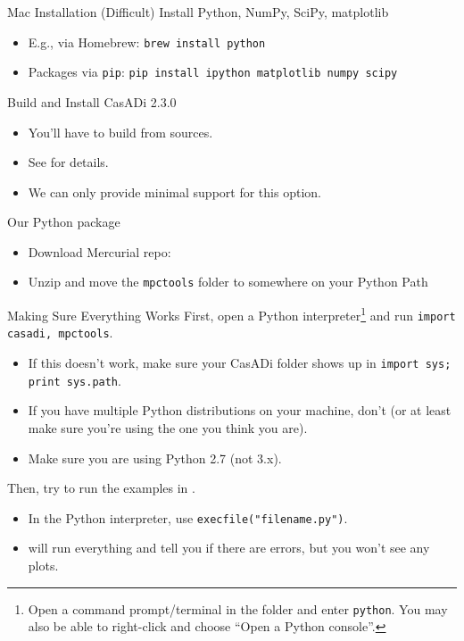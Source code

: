 \documentclass[xcolor=dvipsnames]{beamer}
\begin{document}
\begin{frame}{Mac Installation (Difficult)}
       Install Python, NumPy, SciPy, matplotlib
       \begin{itemize}
           \item E.g., via Homebrew: \lstinline[style=shell]!brew install python!
           \item Packages via \texttt{pip}: \lstinline[style=shell]!pip install ipython matplotlib numpy scipy
           !
        \end{itemize}
        
        \medskip
        
        Build and Install CasADi 2.3.0
        \begin{itemize}
            \item You'll have to build from sources.
            \item See  for details.
            \item We can only provide minimal support for this option.
        \end{itemize}
        
        \medskip
        
        Our Python package
        \begin{itemize}
            \item Download Mercurial repo: 
            \item Unzip and move the \texttt{mpctools} folder to somewhere on your Python Path
        \end{itemize}
\end{frame}

\begin{frame}{Making Sure Everything Works}
    First, open a Python interpreter\footnote{Open a command prompt/terminal in the  folder and enter \lstinline[style=shell]!python!. You may also be able to right-click and choose ``Open a Python console''.} and run \lstinline[style=python]!import casadi, mpctools!.
    \begin{itemize}
        \item If this doesn't work, make sure your CasADi folder shows up in \lstinline[style=python]!import sys; print sys.path!.
        \item If you have multiple Python distributions on your machine, don't (or at least make sure you're using the one you think you are).
        \item Make sure you are using Python 2.7 (not 3.x).
    \end{itemize}
        
    Then, try to run the examples in .
    \begin{itemize}
        \item In the Python interpreter, use \lstinline[style=python]!execfile("filename.py")!.
        \item {} will run everything and tell you if there are errors, but you won't see any plots.
    \end{itemize}
\end{frame}
\end{document}
